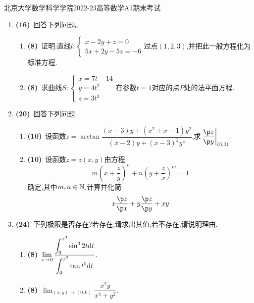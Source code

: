 \documentclass{ctexart}
\begin{document}
\pagestyle{empty}

\begin{center}\Large
    北京大学数学科学学院2022-23高等数学A1期末考试
\end{center}
\begin{enumerate}[leftmargin=*,label=\textbf{\arabic*.}]
    \item \textbf{(16)}\ 回答下列问题。
        \begin{enumerate}[label=\tbf{(\arabic*)}]
            \item \textbf{(8)}\ 证明:直线$l:\left\{\begin{array}{l}
                    x-2y+z=0\\
                    5x+2y-5z=-6
                \end{array}\right.$过点$(1,2,3)$,并把此一般方程化为标准方程.
            \item \textbf{(8)}\ 求曲线$S:\left\{\begin{array}{l}
                    x=7t-14\\
                    y=4t^2\\
                    z=3t^3    
                \end{array}\right.$在参数$t=1$对应的点$P$处的法平面方程.
        \end{enumerate}
    \item \textbf{(20)}\ 回答下列问题.
        \begin{enumerate}[label=\tbf{(\arabic*)}]
            \item \textbf{(10)}\ 设函数$z=\arctan\dfrac{(x-3)y+(x^2+x-1)y^2}{(x-2)y+(x-3)^2y^4}$,求$\left.\dfrac{\p z}{\p y}\right|_{(3,0)}$.
            \item \textbf{(10)}\ 设函数$z=z(x,y)$由方程\[m\left(x+\dfrac zy\right)^n+n\left(y+\dfrac zx\right)^m=1\]确定,其中$m,n\in\mathbb{N}$.计算并化简\[x\dfrac{\p z}{\p x}+y\dfrac{\p z}{\p y}+xy\]
        \end{enumerate}
    \item \textbf{(24)}\ 下列极限是否存在?若存在,请求出其值;若不存在,请说明理由.
        \begin{enumerate}[label=\tbf{(\arabic*)}]
            \item \textbf{(8)}\ \(\displaystyle\lim_{x\to0}\dfrac{\displaystyle\int_0^{x^3}\sin^32t\mathrm{d} t}{\displaystyle\int_0^{x^2}\tan t^5\mathrm{d} t}\).
            \item \textbf{(8)}\ \(\displaystyle\lim_{(x,y)\to(0,0)}\dfrac{x^2y}{x^4+y^2}\).

\end{enumerate}
\end{enumerate}
\end{document}
